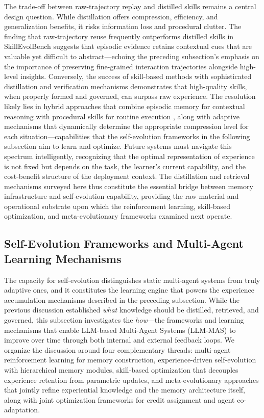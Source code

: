 \documentclass[11pt]{article}
\begin{document}
The trade-off between raw-trajectory replay and distilled skills remains a central design question. While distillation offers compression, efficiency, and generalization benefits, it risks information loss and procedural clutter. The finding that raw-trajectory reuse frequently outperforms distilled skills in SkillEvolBench \cite{ref140} suggests that episodic evidence retains contextual cues that are valuable yet difficult to abstract---echoing the preceding subsection's emphasis on the importance of preserving fine-grained interaction trajectories alongside high-level insights. Conversely, the success of skill-based methods with sophisticated distillation and verification mechanisms \cite{ref141,ref146} demonstrates that high-quality skills, when properly formed and governed, can surpass raw experience. The resolution likely lies in hybrid approaches that combine episodic memory for contextual reasoning with procedural skills for routine execution \cite{ref130}, along with adaptive mechanisms that dynamically determine the appropriate compression level for each situation---capabilities that the self-evolution frameworks in the following subsection aim to learn and optimize. Future systems must navigate this spectrum intelligently, recognizing that the optimal representation of experience is not fixed but depends on the task, the learner's current capability, and the cost-benefit structure of the deployment context. The distillation and retrieval mechanisms surveyed here thus constitute the essential bridge between memory infrastructure and self-evolution capability, providing the raw material and operational substrate upon which the reinforcement learning, skill-based optimization, and meta-evolutionary frameworks examined next operate.

\subsection{Self-Evolution Frameworks and Multi-Agent Learning Mechanisms}

The capacity for self-evolution distinguishes static multi-agent systems from truly adaptive ones, and it constitutes the learning engine that powers the experience accumulation mechanisms described in the preceding subsection. While the previous discussion established \emph{what} knowledge should be distilled, retrieved, and governed, this subsection investigates the \emph{how}---the frameworks and learning mechanisms that enable LLM-based Multi-Agent Systems (LLM-MAS) to improve over time through both internal and external feedback loops. We organize the discussion around four complementary threads: multi-agent reinforcement learning for memory construction, experience-driven self-evolution with hierarchical memory modules, skill-based optimization that decouples experience retention from parametric updates, and meta-evolutionary approaches that jointly refine experiential knowledge and the memory architecture itself, along with joint optimization frameworks for credit assignment and agent co-adaptation.
\end{document}

